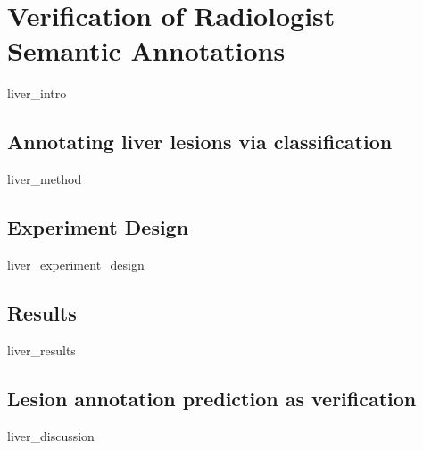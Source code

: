 \chapter{Verification of Radiologist Semantic Annotations}
{liver_intro}

\section{Annotating liver lesions via classification}
{liver_method}
\clearpage

\section{Experiment Design}
{liver_experiment_design}
\clearpage

\section{Results}
{liver_results}
\clearpage

\section{Lesion annotation prediction as verification}
{liver_discussion}